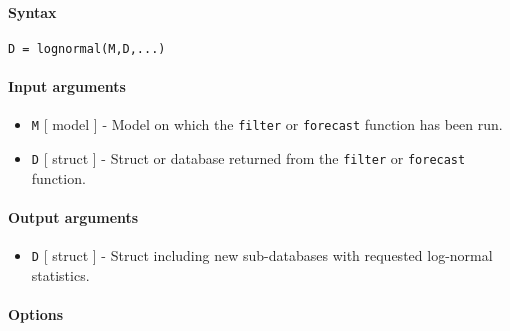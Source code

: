 


	\paragraph{Syntax}

\begin{verbatim}
D = lognormal(M,D,...)
\end{verbatim}

\paragraph{Input arguments}

\begin{itemize}
\item
  \texttt{M} {[} model {]} - Model on which the \texttt{filter} or
  \texttt{forecast} function has been run.
\item
  \texttt{D} {[} struct {]} - Struct or database returned from the
  \texttt{filter} or \texttt{forecast} function.
\end{itemize}

\paragraph{Output arguments}

\begin{itemize}
\itemsep1pt\parskip0pt
\item
  \texttt{D} {[} struct {]} - Struct including new sub-databases with
  requested log-normal statistics.
\end{itemize}

\paragraph{Options}


